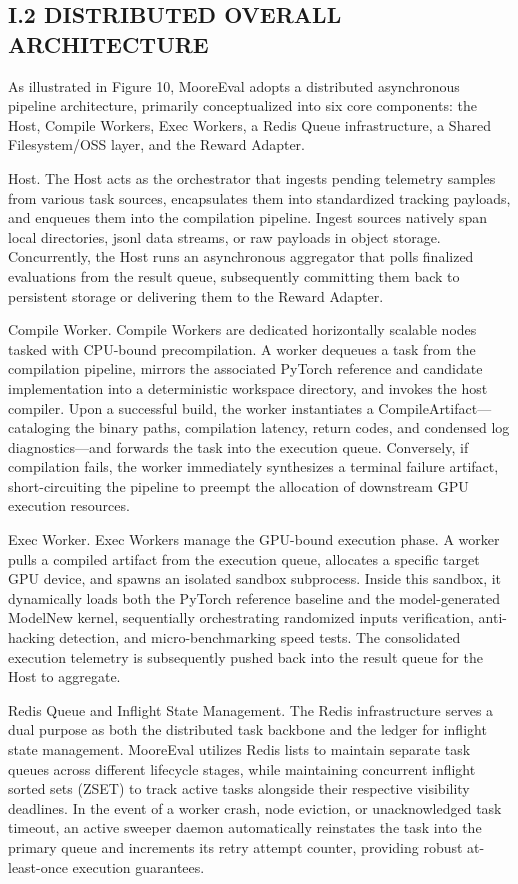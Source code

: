 \documentclass[
  10
]{article}
\begin{document}
\subsection{I.2 DISTRIBUTED OVERALL
ARCHITECTURE}\label{i.2-distributed-overall-architecture}

As illustrated in Figure 10, MooreEval adopts a distributed asynchronous
pipeline architecture, primarily conceptualized into six core
components: the Host, Compile Workers, Exec Workers, a Redis Queue
infrastructure, a Shared Filesystem/OSS layer, and the Reward Adapter.

Host. The Host acts as the orchestrator that ingests pending telemetry
samples from various task sources, encapsulates them into standardized
tracking payloads, and enqueues them into the compilation pipeline.
Ingest sources natively span local directories, jsonl data streams, or
raw payloads in object storage. Concurrently, the Host runs an
asynchronous aggregator that polls finalized evaluations from the result
queue, subsequently committing them back to persistent storage or
delivering them to the Reward Adapter.

Compile Worker. Compile Workers are dedicated horizontally scalable
nodes tasked with CPU-bound precompilation. A worker dequeues a task
from the compilation pipeline, mirrors the associated PyTorch reference
and candidate implementation into a deterministic workspace directory,
and invokes the host compiler. Upon a successful build, the worker
instantiates a CompileArtifact---cataloging the binary paths,
compilation latency, return codes, and condensed log diagnostics---and
forwards the task into the execution queue. Conversely, if compilation
fails, the worker immediately synthesizes a terminal failure artifact,
short-circuiting the pipeline to preempt the allocation of downstream
GPU execution resources.

Exec Worker. Exec Workers manage the GPU-bound execution phase. A worker
pulls a compiled artifact from the execution queue, allocates a specific
target GPU device, and spawns an isolated sandbox subprocess. Inside
this sandbox, it dynamically loads both the PyTorch reference baseline
and the model-generated ModelNew kernel, sequentially orchestrating
randomized inputs verification, anti-hacking detection, and
micro-benchmarking speed tests. The consolidated execution telemetry is
subsequently pushed back into the result queue for the Host to
aggregate.

Redis Queue and Inflight State Management. The Redis infrastructure
serves a dual purpose as both the distributed task backbone and the
ledger for inflight state management. MooreEval utilizes Redis lists to
maintain separate task queues across different lifecycle stages, while
maintaining concurrent inflight sorted sets (ZSET) to track active tasks
alongside their respective visibility deadlines. In the event of a
worker crash, node eviction, or unacknowledged task timeout, an active
sweeper daemon automatically reinstates the task into the primary queue
and increments its retry attempt counter, providing robust at-least-once
execution guarantees.
\end{document}
